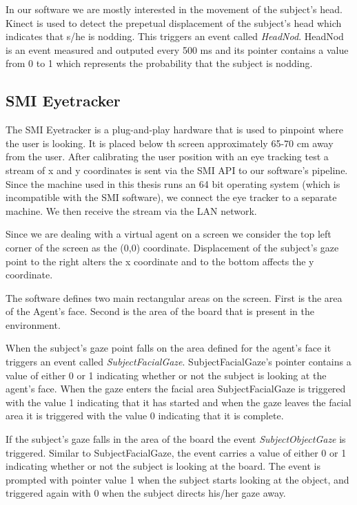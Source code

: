 \documentclass[12pt, a4paper, fleqn]{memoir}%
\begin{document}
In our software we are mostly interested in the movement of the subject's head. Kinect is used to detect the prepetual displacement of the subject's head which indicates that s/he is nodding. This triggers an event called \textit{HeadNod}. HeadNod is an event measured and outputed every 500 ms and its pointer contains a value from 0 to 1 which represents the probability that the subject is nodding.

\subsection{SMI Eyetracker}
The SMI Eyetracker is a plug-and-play hardware that is used to pinpoint where the user is looking. It is placed below th screen approximately 65-70 cm away from the user. After calibrating the user position with an eye tracking test a stream of x and y coordinates is sent via the SMI API to our software's pipeline. Since the machine used in this thesis runs an 64 bit operating system (which is incompatible with the SMI software), we connect the eye tracker to a separate machine. We then receive the stream via the LAN network.

Since we are dealing with a virtual agent on a screen we consider the top left corner of the screen as the (0,0) coordinate. Displacement of the subject's gaze point to the right alters the x coordinate and to the bottom affects the y coordinate.

The software defines two main rectangular areas on the screen. First is the area of the Agent's face. Second is the area of the board that is present in the environment.

When the subject's gaze point falls on the area defined for the agent's face it triggers an event called \textit{SubjectFacialGaze}. SubjectFacialGaze's pointer contains a value of either 0 or 1 indicating whether or not the subject is looking at the agent's face. When the gaze enters the facial area SubjectFacialGaze is triggered with the value 1 indicating that it has started and when the gaze leaves the facial area it is triggered with the value 0 indicating that it is complete.

If the subject's gaze falls in the area of the board the event \textit{SubjectObjectGaze} is triggered. Similar to SubjectFacialGaze, the event carries a value of either 0 or 1 indicating whether or not the subject is looking at the board. The event is prompted with pointer value 1 when the subject starts looking at the object, and triggered again with 0 when the subject directs his/her gaze away.
\end{document}
